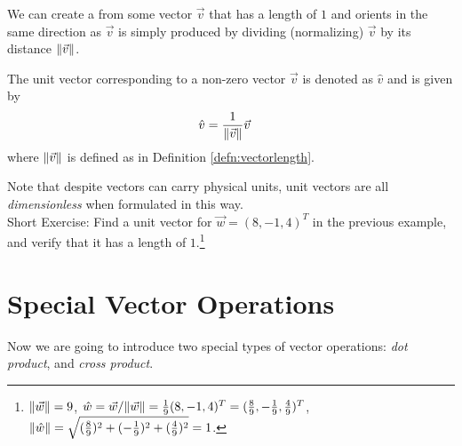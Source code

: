 We can create a  from some vector $\vec{v}$ that has a length of $1$ and orients in the same direction as $\vec{v}$ is simply produced by dividing (normalizing) $\vec{v}$ by its distance $\norm{\vec{v}}$.
\begin{defn}
\label{defn:unitvec}
The unit vector corresponding to a non-zero vector $\vec{v}$ is denoted as $\hat{v}$ and is given by
\begin{align*}
\hat{v} &= \frac{1}{\norm{\vec{v}}}\vec{v}
\end{align*}
where $\norm{\vec{v}}$ is defined as in Definition \ref{defn:vectorlength}. 
\end{defn}
Note that despite vectors can carry physical units, unit vectors  are all \textit{dimensionless} when formulated in this way. \\
Short Exercise: Find a unit vector for $\vec{w} = (8, -1, 4)^T$ in the previous example, and verify that it has a length of $1$.\footnote{$\norm{\vec{w}} = 9$, $\hat{w} = \vec{w}/\norm{\vec{w}} = \frac{1}{9}(8,-1,4)^T = (\frac{8}{9}, -\frac{1}{9}, \frac{4}{9})^T$, $\norm{\hat{w}} = \sqrt{(\frac{8}{9})^2 + (-\frac{1}{9})^2 + (\frac{4}{9})^2} = 1$.}

\section{Special Vector Operations}
\label{vectorops}
Now we are going to introduce two special types of vector operations: \textit{dot product}, and \textit{cross product}. 

